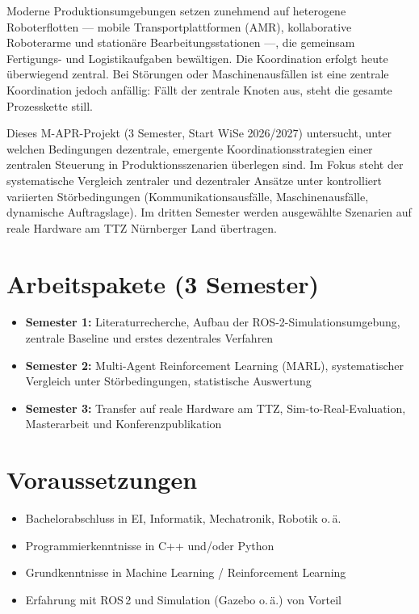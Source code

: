 \documentclass{ohm_project_description}
\begin{document}
\maketitle
\thispagestyle{fancy}

Moderne Produktionsumgebungen setzen zunehmend auf heterogene Roboterflotten — mobile Transportplattformen (AMR), kollaborative Roboterarme und stationäre Bearbeitungsstationen —, die gemeinsam Fertigungs- und Logistikaufgaben bewältigen. Die Koordination erfolgt heute überwiegend zentral. Bei Störungen oder Maschinenausfällen ist eine zentrale Koordination jedoch anfällig: Fällt der zentrale Knoten aus, steht die gesamte Prozesskette still.

Dieses M-APR-Projekt (3 Semester, Start WiSe 2026/2027) untersucht, unter welchen Bedingungen dezentrale, emergente Koordinationsstrategien einer zentralen Steuerung in Produktionsszenarien überlegen sind. Im Fokus steht der systematische Vergleich zentraler und dezentraler Ansätze unter kontrolliert variierten Störbedingungen (Kommunikationsausfälle, Maschinenausfälle, dynamische Auftragslage). Im dritten Semester werden ausgewählte Szenarien auf reale Hardware am TTZ Nürnberger Land übertragen.

\section*{Arbeitspakete (3 Semester)}
\begin{itemize}[leftmargin=0.5cm]
    \setlength\itemsep{.1em}
    \item \textbf{Semester 1:} Literaturrecherche, Aufbau der ROS-2-Simulationsumgebung, zentrale Baseline und erstes dezentrales Verfahren
    \item \textbf{Semester 2:} Multi-Agent Reinforcement Learning (MARL), systematischer Vergleich unter Störbedingungen, statistische Auswertung
    \item \textbf{Semester 3:} Transfer auf reale Hardware am TTZ, Sim-to-Real-Evaluation, Masterarbeit und Konferenzpublikation
\end{itemize}

\section*{Voraussetzungen}
\begin{itemize}[leftmargin=0.5cm]
    \setlength\itemsep{.1em}
    \item Bachelorabschluss in EI, Informatik, Mechatronik, Robotik o.\,ä.
    \item Programmierkenntnisse in C++ und/oder Python
    \item Grundkenntnisse in Machine Learning / Reinforcement Learning
    \item Erfahrung mit ROS\,2 und Simulation (Gazebo o.\,ä.) von Vorteil
\end{itemize}
\end{document}
